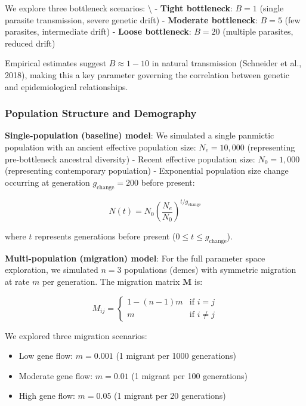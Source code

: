 \documentclass[
  11pt,
]{article}
\providecommand{\tightlist}{%
  \setlength{\itemsep}{0pt}\setlength{\parskip}{0pt}}
\begin{document}
We explore three bottleneck scenarios: \textbackslash{} - \textbf{Tight
bottleneck}: \(B = 1\) (single parasite transmission, severe genetic
drift) - \textbf{Moderate bottleneck}: \(B = 5\) (few parasites,
intermediate drift) - \textbf{Loose bottleneck}: \(B = 20\) (multiple
parasites, reduced drift)

Empirical estimates suggest \(B \approx 1-10\) in natural transmission
(Schneider et al., 2018), making this a key parameter governing the
correlation between genetic and epidemiological relationships.

\subsubsection{Population Structure and
Demography}\label{population-structure-and-demography}

\textbf{Single-population (baseline) model}: We simulated a single
panmictic population with an ancient effective population size:
\(N_e = 10,000\) (representing pre-bottleneck ancestral diversity) -
Recent effective population size: \(N_0 = 1,000\) (representing
contemporary population) - Exponential population size change occurring
at generation \(g_{\text{change}} = 200\) before present:

\[N(t) = N_0 \left(\frac{N_e}{N_0}\right)^{t/g_{\text{change}}}\]

where \(t\) represents generations before present
(\(0 \leq t \leq g_{\text{change}}\)).

\textbf{Multi-population (migration) model}: For the full parameter
space exploration, we simulated \(n = 3\) populations (demes) with
symmetric migration at rate \(m\) per generation. The migration matrix
\(\mathbf{M}\) is:

\[M_{ij} = \begin{cases}
1 - (n-1)m & \text{if } i = j \\
m & \text{if } i \neq j
\end{cases}\]

We explored three migration scenarios:

\begin{itemize}
\tightlist
\item
  Low gene flow: \(m = 0.001\) (1 migrant per 1000 generations)
\item
  Moderate gene flow: \(m = 0.01\) (1 migrant per 100 generations)
\item
  High gene flow: \(m = 0.05\) (1 migrant per 20 generations)
\end{itemize}
\end{document}
